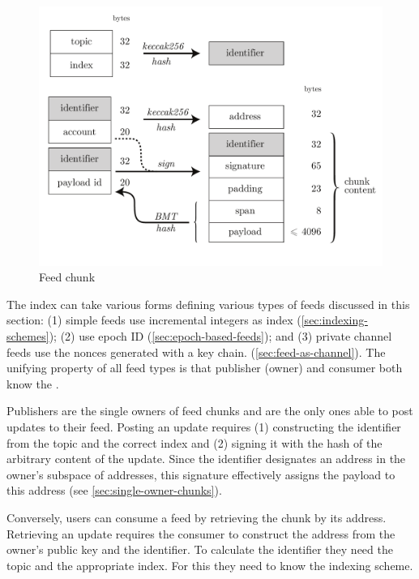 \begin{figure}[htbp]
\centering
\includegraphics[width=\textwidth]{fig/feed-chunk.pdf}
\caption[Feed chunk \statusred]{Feed chunk}
\label{fig:feed-chunk}
\end{figure}

The index can take various forms defining various types of feeds discussed in this section: (1) simple feeds use incremental integers as index (\ref{sec:indexing-schemes}); (2)   use epoch ID (\ref{sec:epoch-based-feeds}); and (3) private channel feeds use the nonces generated with a  key chain.  (\ref{sec:feed-as-channel}).
The unifying property of all feed types is that publisher (owner) and consumer both know the . 

Publishers are the single owners of feed chunks and are the only ones able to post updates to their feed. Posting an update requires (1) constructing the identifier from the topic and the correct index and (2) signing it with the hash of the arbitrary content of the update. Since the identifier designates an address in the owner's subspace of addresses, this signature effectively assigns the payload to this address (see \ref{sec:single-owner-chunks}). 

Conversely, users  can consume a feed by retrieving the chunk by its address. Retrieving an update requires the consumer to construct the address from the owner's public key and the identifier. To calculate the identifier they need the topic and the appropriate index. For this they need to know the indexing scheme. 

